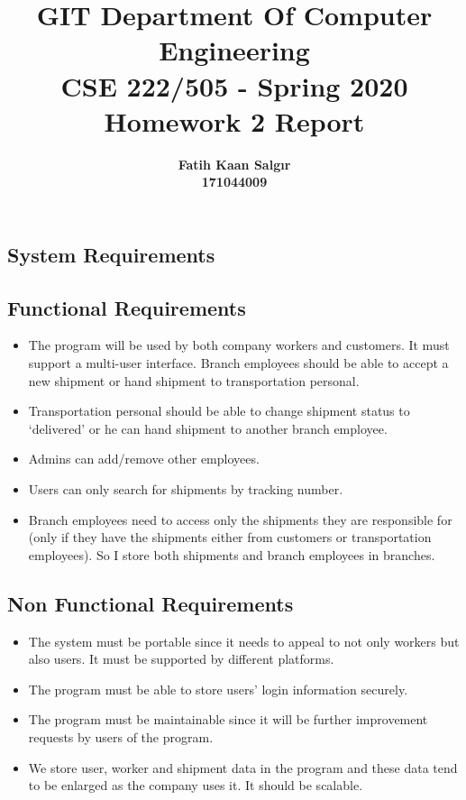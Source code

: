 \documentclass[a4paper]{article}
\title{\textbf{GIT Department Of Computer Engineering\\ 
CSE 222/505 - Spring 2020\\
Homework 2 Report \vspace{1in}}}
\author{\textbf{Fatih Kaan Salgır} \\ 
\textbf{171044009}}
\date{}
\begin{document}
\begin{Large}

\maketitle

\newpage

\section{System Requirements}

\subsection{Functional Requirements}

\begin{itemize}
	\item  The program will be used by both company workers and customers. It
	must support a multi-user interface.
	Branch employees should be able to accept a new shipment or hand
	shipment to transportation personal.
	\item Transportation personal should be able to change shipment status to
	‘delivered’ or he can hand shipment to another branch employee.
	\item Admins can add/remove other employees.
	\item Users can only search for shipments by tracking number.
	\item Branch employees need to access only the shipments they are
	responsible for (only if they have the shipments either from
	customers or transportation employees). So I store both shipments
	and branch employees in branches.
\end{itemize}

\subsection{Non Functional Requirements}

\begin{itemize}
	\item The system must be portable since it needs to appeal to not only
	workers but also users. It must be supported by different platforms.
	\item The program must be able to store users' login information securely.
	\item The program must be maintainable since it will be further
	improvement requests by users of the program.
	\item We store user, worker and shipment data in the program and these
	data tend to be enlarged as the company uses it. It should be scalable.
\end{itemize}


\end{Large}
\end{document}
